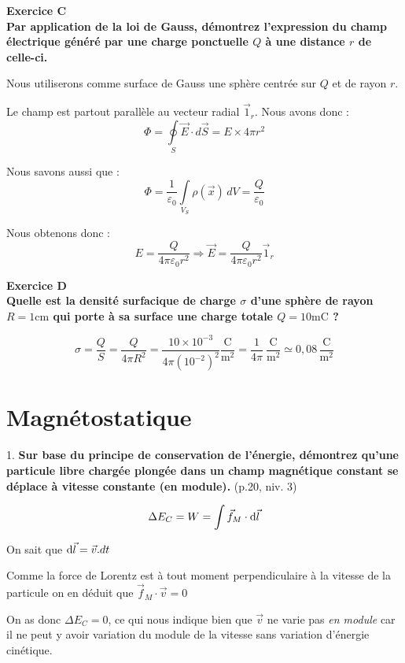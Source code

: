 \documentclass	[11pt, a4paper, openany]{book}
\newcommand{\E}{\vec E}
\newcommand{\exerc}[2]{\textbf{\Large Exercice #1\normalsize \\#2}}
\begin{document}
\vspace{0,5cm}

\exerc{C}{Par application de la loi de Gauss, démontrez l'expression du champ électrique généré par une charge ponctuelle $Q$ à une distance $r$ de celle-ci.}
	
	Nous utiliserons comme surface de Gauss une sphère centrée sur $Q$ et de rayon $r$.
	
	Le champ est partout parallèle au vecteur radial $\vec 1_r$. Nous avons donc : $$ \Phi = \oint  \limits_S \E \cdot d \vec S = E \times 4\pi r^2 $$
	
	Nous savons aussi que : $$ \Phi = \dfrac{1}{\varepsilon_0} \int \limits_{V_S} \rho (\vec x) \, dV = \dfrac{Q}{\varepsilon_0} $$
	
	Nous obtenons donc : $$ E = \dfrac{Q}{4\pi \varepsilon_0 r^2} \Rightarrow \vec E = \dfrac{Q}{4\pi \varepsilon_0 r^2} \vec 1_r $$

\vspace{0,5cm}

\exerc{D}{Quelle est la densité surfacique de charge $\sigma$ d'une sphère de rayon $R = 1\mathrm{cm}$ qui porte à sa surface une charge totale $Q = 10\mathrm{mC}$ ?}
	
	$$ \sigma = \dfrac{Q}{S} = \dfrac{Q}{4\pi R^2} = \dfrac{10\times 10^{-3}}{4\pi (10^{-2})^2} \dfrac{\mathrm{C}}{\mathrm{m}^2} = \dfrac{1}{4\pi}\ \dfrac{\mathrm{C}}{\mathrm{m}^2} \simeq 0,08\,\dfrac{\mathrm{C}}{\mathrm{m}^2}$$

\vspace{0,5cm}
		
		
\newpage
\renewcommand{\quest}[4]{#1. \textbf{#4} (p.#2, niv. #3)}
\section{Magnétostatique}

\quest{1}{20}{3}{Sur base du principe de conservation de l’énergie, démontrez qu’une particule libre chargée plongée dans un champ magnétique constant se déplace à vitesse constante (en module).}

$$\Delta E_C = W = \int \vec f_M \cdot {\rm d}\vec l$$

On sait que ${\rm d}\vec l = \vec v . dt$

Comme la force de Lorentz est à tout moment perpendiculaire à la vitesse de la particule on en déduit que $\vec f_M \cdot \vec v = 0$

On as donc $\Delta E_C = 0$, ce qui nous indique bien que $\vec v$ ne varie pas \emph{en module} car il ne peut y avoir variation du module de la vitesse sans variation d'énergie cinétique.
\end{document}
